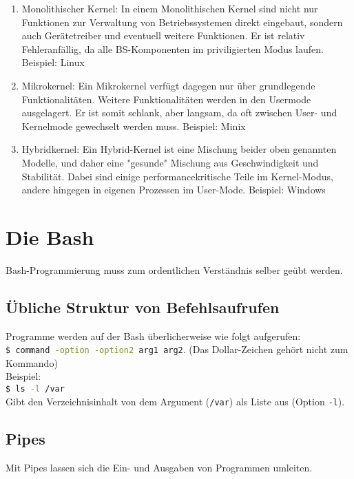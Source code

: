 \documentclass[11pt]{scrartcl}
\begin{document}
\begin{enumerate}
\item{Monolithischer Kernel: In einem Monolithischen Kernel sind nicht nur Funktionen zur Verwaltung von Betriebssystemen direkt eingebaut, sondern auch Gerätetreiber und eventuell weitere Funktionen. Er ist relativ Fehleranfällig, da alle BS-Komponenten im priviligierten Modus laufen. Beispiel: Linux}
\item{Mikrokernel: Ein Mikrokernel verfügt dagegen nur über grundlegende Funktionalitäten. Weitere Funktionalitäten werden in den Usermode ausgelagert. Er ist somit schlank, aber langsam, da oft zwischen User- und Kernelmode gewechselt werden muss. Beispiel: Minix}
\item{Hybridkernel: Ein Hybrid-Kernel ist eine Mischung beider oben genannten Modelle, und daher eine "gesunde" Mischung aus Geschwindigkeit und Stabilität. Dabei sind einige performancekritische Teile im Kernel-Modus, andere hingegen in eigenen Prozessen im User-Mode. Beispiel: Windows}
\end{enumerate}

\section{Die Bash}
Bash-Programmierung muss zum ordentlichen Verständnis selber geübt werden.

\subsection{Übliche Struktur von Befehlsaufrufen}
Programme werden auf der Bash überlicherweise wie folgt aufgerufen: \\
\lstinline[language=Bash]{$ command -option -option2 arg1 arg2}. (Das Dollar-Zeichen gehört nicht zum Kommando)\\

Beispiel:\\
\lstinline[language=Bash]{$ ls -l /var}\\
Gibt den Verzeichnisinhalt von dem Argument (\lstinline{/var}) als Liste aus (Option \lstinline{-l}).

\subsection{Pipes}
Mit Pipes lassen sich die Ein- und Ausgaben von Programmen umleiten. \\
\end{document}
